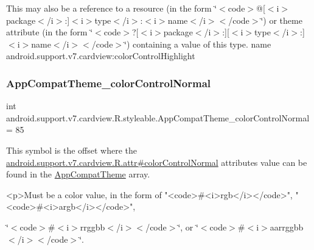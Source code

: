 This may also be a reference to a resource (in the form \char`\"{}$<$code$>$@\mbox{[}$<$i$>$package$<$/i$>$\+:\mbox{]}$<$i$>$type$<$/i$>$\+:$<$i$>$name$<$/i$>$$<$/code$>$\char`\"{}) or theme attribute (in the form \char`\"{}$<$code$>$?\mbox{[}$<$i$>$package$<$/i$>$\+:\mbox{]}\mbox{[}$<$i$>$type$<$/i$>$\+:\mbox{]}$<$i$>$name$<$/i$>$$<$/code$>$\char`\"{}) containing a value of this type.  name android.\+support.\+v7.\+cardview\+:color\+Control\+Highlight \mbox{\label{classandroid_1_1support_1_1v7_1_1cardview_1_1R_1_1styleable_a4c2e0c570b5982613b8cebb46cb6626a}} 
\subsubsection{\texorpdfstring{App\+Compat\+Theme\+\_\+color\+Control\+Normal}{AppCompatTheme\_colorControlNormal}}
{\footnotesize\ttfamily int android.\+support.\+v7.\+cardview.\+R.\+styleable.\+App\+Compat\+Theme\+\_\+color\+Control\+Normal = 85\hspace{0.3cm}{\ttfamily [static]}}

This symbol is the offset where the \hyperlink{classandroid_1_1support_1_1v7_1_1cardview_1_1R_1_1attr_a2e36c56263c970e32558384c77afe906}{android.\+support.\+v7.\+cardview.\+R.\+attr\#color\+Control\+Normal} attribute\textquotesingle{}s value can be found in the \hyperlink{classandroid_1_1support_1_1v7_1_1cardview_1_1R_1_1styleable_a52e6f69f954ecc2622d72c0b4d298938}{App\+Compat\+Theme} array.

\begin{DoxyVerb}      <p>Must be a color value, in the form of "<code>#<i>rgb</i></code>", "<code>#<i>argb</i></code>",
\end{DoxyVerb}
 \char`\"{}$<$code$>$\#$<$i$>$rrggbb$<$/i$>$$<$/code$>$\char`\"{}, or \char`\"{}$<$code$>$\#$<$i$>$aarrggbb$<$/i$>$$<$/code$>$\char`\"{}. 

